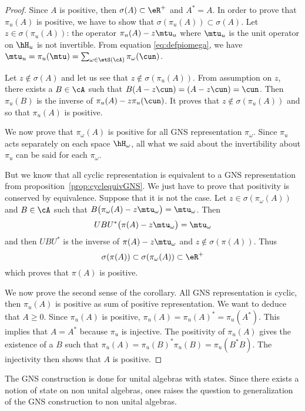 \begin{proof}
Since $A$ is positive, then $\sigma(A)\subset\eR^+$ and $A^*=A$. In order to prove that $\pi_u(A)$ is positive, we have to show that $\sigma(\pi_u(A))\subset\sigma(A)$. Let $z\in\sigma(\pi_u(A))$: the operator $\pi_u(A)-z\mtu_u$ where $\mtu_u$ is the unit operator on $\hH_u$ is not invertible. From equation  \eqref{eq:defpiomega},  we have $\mtu_u=\pi_u(\mtu)=\sum_{\omega\in\etS(\cA)}\pi_{\omega}(\cun)$.

Let $z\notin\sigma(A)$ and let us see that $z\notin\sigma(\pi_u(A))$. From assumption on $z$, there exists a $B\in\cA$ such that $B(A-z\cun)=(A-z\cun)=\cun$. Then $\pi_u(B)$ is the inverse of $\pi_u(A)-z\pi_u(\cun)$. It proves that $z\notin\sigma(\pi_u(A))$ and so that $\pi_u(A)$ is positive.

We now prove that $\pi_{\omega}(A)$ is positive for all GNS representation $\pi_{\omega}$. Since $\pi_u$ acts separately on each space $\hH_{\omega}$, all what we said about the invertibility about $\pi_u$ can be said for each $\pi_{\omega}$.

But we know that all cyclic representation is equivalent to a GNS representation from proposition~\ref{prop:cyclequivGNS}. We just have to prove that positivity is conserved by equivalence. Suppose that it is not the case. Let $z\in\sigma(\pi_{\omega}(A))$ and $B\in\cA$ such that $B\big( \pi_{\omega}(A)-z\mtu_{\omega} \big)=\mtu_{\omega}$. Then
\[
  UBU^*\big( \pi(A)-z\mtu_{\omega} \big)=\mtu_{\omega}
\]
and then $UBU^*$ is the inverse of $\pi(A)-z\mtu_{\omega}$ and $z\notin\sigma(\pi(A))$. Thus
\[
  \sigma(\pi(A))\subset\sigma(\pi_{\omega}(A))\subset\eR^+
\]
which proves that $\pi(A)$ is positive.

We now prove the second sense of the corollary. All GNS representation is cyclic, then $\pi_u(A)$ is positive as sum of positive representation. We want to deduce that $A\geq0$. Since $\pi_u(A)$ is positive, $\pi_u(A)=\pi_u(A)^*=\pi_u(A^*)$. This implies that $A=A^*$ because $\pi_u$ is injective. The positivity of $\pi_u(A)$ gives the existence of a $B$ such that  $\pi_u(A)=\pi_u(B)^*\pi_u(B)=\pi_u(B^*B)$. The injectivity then shows that $A$ is positive.

\end{proof}

The GNS construction is done for unital algebras with states. Since there exists a notion of state on non unital algebras, ones raises the question to generalization of the GNS construction to non unital algebras.

